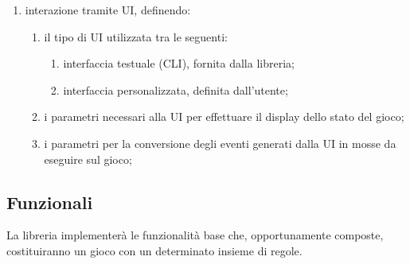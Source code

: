 \begin{enumerate}[resume]
\begin{enumerate}[label*=\arabic*.]
\begin{enumerate}[label*=\arabic*.]
        \end{enumerate}
        \item interazione tramite UI, definendo:
        \begin{enumerate}[label*=\arabic*.]
            \item il tipo di UI utilizzata tra le seguenti:
            \begin{enumerate}[label*=\arabic*.]
                \item \label{req:cli} interfaccia testuale (CLI), fornita dalla libreria;
                \item \label{req:custom_view} interfaccia personalizzata, definita dall'utente;
            \end{enumerate}
            \item \label{req:renderers_parameters} i parametri necessari alla UI per effettuare il display dello stato del gioco;
            \item \label{req:events} i parametri per la conversione degli eventi generati dalla UI in mosse da eseguire sul gioco;
        \end{enumerate}
    \end{enumerate}
\end{enumerate}

\subsection{Funzionali}

La libreria implementerà le funzionalità base che, opportunamente composte, costituiranno un gioco con un determinato insieme di regole.

